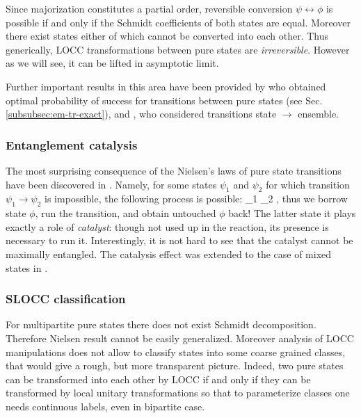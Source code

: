 \documentclass[twocolumn,aps,rmp]{revtex4}
\begin{document}
Since majorization constitutes a partial order, reversible conversion
$\psi\leftrightarrow\phi$ is possible if and only if the Schmidt
coefficients of both states are equal. Moreover there exist states
either of which cannot be converted into each other. Thus generically,
LOCC transformations between pure states are {\it
  irreversible}. However as we will see, it can be lifted in
asymptotic limit.

Further important results in this area have been provided by
\cite{Vidal} who obtained optimal probability of success for
transitions between pure states (see
Sec. \ref{subsubsec:em-tr-exact}), and \cite{JonathanP}, who
considered transitions state $\to$ ensemble.




\subsubsection{Entanglement catalysis}
\label{subsec:catalysis}
The most surprising consequence of the Nielsen's laws of pure state
transitions have been discovered in \cite{JonathanP}. Namely, for
some states $\psi_1$ and $\psi_2$ for which transition $\psi_1 \to
\psi_2$  is impossible, the following process is possible: \be
\psi_1 \ot \phi \to \psi_2 \ot\phi, \ee thus we borrow state $\phi$,
run the transition, and obtain untouched $\phi$ back! The latter
state it plays exactly a role of {\it catalyst}: though not used up
in the reaction, its presence is necessary to run it.
Interestingly, it is not hard to see that the catalyst  cannot be
maximally entangled. The catalysis effect was extended to the case
of mixed states in \cite{EisertWilkens}.


\subsubsection{SLOCC classification}
\label{subsubsec:slocc}
For multipartite pure states there does not exist Schmidt
decomposition. Therefore Nielsen result cannot be easily
generalized. Moreover analysis of LOCC manipulations does not allow
to classify states into some coarse grained classes, that would give
a rough, but more transparent picture. Indeed, two pure states can
be transformed into each other by LOCC if and only if they can be
transformed by local unitary transformations so that to parameterize
classes one needs continuous labels, even in bipartite case.
\end{document}
